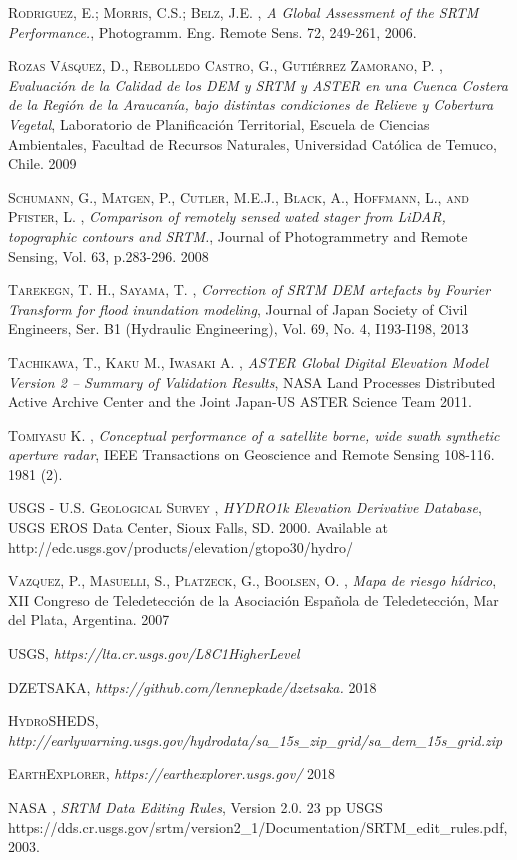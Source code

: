 \begin{thebibliography}{9}
 \textsc{Rodriguez, E.; Morris, C.S.; Belz, J.E.} , \textit{A Global Assessment of the SRTM Performance.},  Photogramm. Eng. Remote Sens. 72, 249-261, 2006.

 \textsc{Rozas Vásquez, D., Rebolledo Castro, G., Gutiérrez Zamorano, P.} , \textit{Evaluación de la Calidad de los DEM y SRTM y ASTER en una Cuenca Costera de la Región de la Araucanía, bajo distintas condiciones de Relieve y Cobertura Vegetal}, Laboratorio de Planificación Territorial, Escuela de Ciencias Ambientales, Facultad de Recursos Naturales, Universidad Católica de Temuco, Chile. 2009

 \textsc{Schumann, G., Matgen, P., Cutler, M.E.J., Black, A., Hoffmann, L., and Pfister, L.} , \textit{Comparison of remotely sensed wated stager from LiDAR, topographic contours and SRTM.}, Journal of Photogrammetry and Remote Sensing, Vol. 63, p.283-296. 2008

 \textsc{Tarekegn, T. H., Sayama, T.} , \textit{Correction of SRTM DEM artefacts by Fourier Transform for flood inundation modeling},  Journal of Japan Society of Civil Engineers, Ser. B1 (Hydraulic Engineering), Vol. 69, No. 4, I193-I198, 2013


 \textsc{Tachikawa, T., Kaku M., Iwasaki A.} , \textit{ASTER Global Digital Elevation Model Version 2 – Summary of Validation Results},  NASA Land Processes Distributed Active Archive Center and the Joint Japan-US ASTER Science Team 2011.

 \textsc{Tomiyasu K.} , \textit{Conceptual performance of a satellite borne, wide swath synthetic aperture radar},  IEEE Transactions on Geoscience and Remote Sensing 108-116. 1981 (2).


 \textsc{USGS - U.S. Geological Survey} , \textit{HYDRO1k Elevation Derivative Database}, USGS EROS Data Center, Sioux Falls, SD. 2000. Available at http://edc.usgs.gov/products/elevation/gtopo30/hydro/


 \textsc{Vazquez, P., Masuelli, S., Platzeck, G., Boolsen, O.} , \textit{Mapa de riesgo hídrico}, XII Congreso de Teledetección de la Asociación Española de Teledetección, Mar del Plata, Argentina. 2007

 \textsc{USGS}, \textit{https://lta.cr.usgs.gov/L8C1HigherLevel}

 \textsc{DZETSAKA}, \textit{https://github.com/lennepkade/dzetsaka.} 2018

 \textsc{HydroSHEDS}, \textit{http://earlywarning.usgs.gov/hydrodata/sa\_15s\_zip\_grid/sa\_dem\_15s\_grid.zip}

 \textsc{EarthExplorer}, \textit{https://earthexplorer.usgs.gov/} 2018

 \textsc{NASA} , \textit{SRTM Data Editing Rules}, Version 2.0. 23 pp USGS \\https://dds.cr.usgs.gov/srtm/version2\_1/Documentation/SRTM\_edit\_rules.pdf, 2003.


\end{thebibliography}
